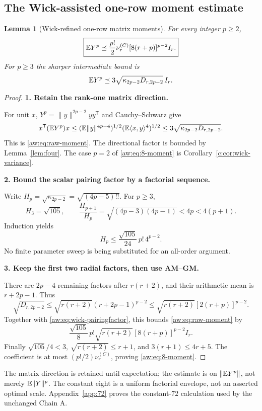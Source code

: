 \documentclass[11pt]{article}
\numberwithin{equation}{section}
\newtheorem{lemma}[theorem]{Lemma}
\theoremstyle{definition}\newtheorem{definition}[theorem]{Definition}
\theoremstyle{remark}\newtheorem{remark}[theorem]{Remark}
\newcommand{\norm}[1]{\lVert#1\rVert}\newcommand{\ip}[2]{\langle#1,#2\rangle}
\newcommand{\step}[1]{\par\addvspace{.65\baselineskip}\Needspace{4\baselineskip}\noindent\textbf{#1}\par\nobreak\smallskip}
\begin{document}
\subsection{The Wick-assisted one-row moment estimate}
\begin{lemma}[Wick-refined one-row matrix moments]\label{aw:lem:raw-moments}
For every integer $p\ge2$,
\begin{equation}\label{aw:eq:8-moment}
 \boxed{\mathbb E Y^p\preceq\frac{p!}{2}\nu_r^{(C)}[8(r+p)]^{p-2}I_r.}
\end{equation}
For $p\ge3$ the sharper intermediate bound is
\begin{equation}\label{aw:eq:raw-moment}
 \mathbb E Y^p\preceq3\sqrt{\kappa_{2p-2}D_{r,2p-2}}\,I_r.
\end{equation}
\end{lemma}
\begin{proof}
\step{1. Retain the rank-one matrix direction.}
For unit $x$, $Y^p=\norm y^{2p-2}yy^{\mathsf T}$ and Cauchy--Schwarz give
\[
 x^{\mathsf T}(\E Y^p)x
 \le(\E\norm y^{4p-4})^{1/2}(\E\ip{x}{y}^4)^{1/2}
 \le3\sqrt{\kappa_{2p-2}D_{r,2p-2}}.
\]
This is \eqref{aw:eq:raw-moment}. The directional factor is bounded by Lemma~\ref{lem:four}.
The case $p=2$ of \eqref{aw:eq:8-moment} is Corollary~\ref{c:cor:wick-variance}.

\step{2. Bound the scalar pairing factor by a factorial sequence.}
Write $H_p=\sqrt{\kappa_{2p-2}}=\sqrt{(4p-5)!!}$. For $p\ge3$,
\[
 H_3=\sqrt{105},\qquad
 \frac{H_{p+1}}{H_p}=\sqrt{(4p-3)(4p-1)}<4p<4(p+1).
\]
Induction yields
\begin{equation}\label{aw:eq:wick-pairingfactor}
 H_p\le\frac{\sqrt{105}}{24}\,p!\,4^{p-2}.
\end{equation}
No finite parameter sweep is being substituted for an all-order argument.

\step{3. Keep the first two radial factors, then use AM--GM.}
There are $2p-4$ remaining factors after $r(r+2)$, and their arithmetic mean is $r+2p-1$. Thus
\[
 \sqrt{D_{r,2p-2}}
 \le\sqrt{r(r+2)}(r+2p-1)^{p-2}
 \le\sqrt{r(r+2)}[2(r+p)]^{p-2}.
\]
Together with \eqref{aw:eq:wick-pairingfactor}, this bounds \eqref{aw:eq:raw-moment} by
\[
 \frac{\sqrt{105}}8\,p!\sqrt{r(r+2)}[8(r+p)]^{p-2}I_r.
\]
Finally $\sqrt{105}/4<3$, $\sqrt{r(r+2)}\le r+1$, and $3(r+1)\le4r+5$. The coefficient is at most $(p!/2)\nu_r^{(C)}$, proving \eqref{aw:eq:8-moment}.
\end{proof}

The matrix direction is retained until expectation; the estimate is on
$\norm{\E Y^p}$, not merely $\E\norm Y^p$. The constant eight is a uniform
factorial envelope, not an asserted optimal scale. Appendix~\ref{app:72} proves the constant-$72$ calculation used by the
unchanged Chain A.
\end{document}
